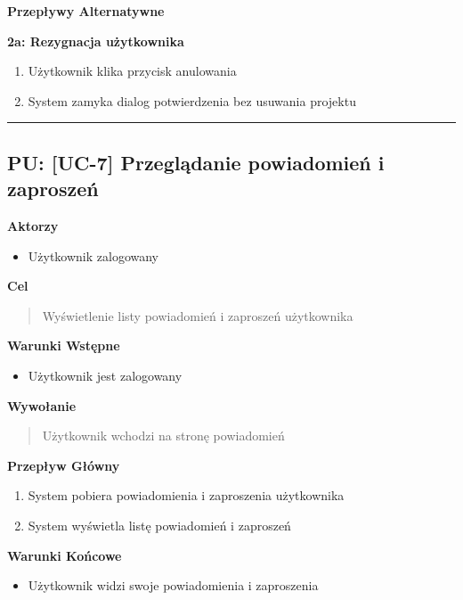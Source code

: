 \vspace{0.2cm}
\noindent\textbf{Przepływy Alternatywne}

\textbf{2a: Rezygnacja użytkownika}
\begin{enumerate}
    \item Użytkownik klika przycisk anulowania
    \item System zamyka dialog potwierdzenia bez usuwania projektu
\end{enumerate}


\hrule
\vspace{1cm}

\subsection*{PU: [UC-7] Przeglądanie powiadomień i zaproszeń}

\noindent\textbf{Aktorzy}
\begin{itemize}
    \item Użytkownik zalogowany
\end{itemize}

\vspace{0.2cm}
\noindent\textbf{Cel}
\begin{quote}
    Wyświetlenie listy powiadomień i zaproszeń użytkownika
\end{quote}

\vspace{0.2cm}
\noindent\textbf{Warunki Wstępne}
\begin{itemize}
    \item Użytkownik jest zalogowany
\end{itemize}

\vspace{0.2cm}
\noindent\textbf{Wywołanie}
\begin{quote}
    Użytkownik wchodzi na stronę powiadomień
\end{quote}

\vspace{0.2cm}
\noindent\textbf{Przepływ Główny}
\begin{enumerate}
    \item System pobiera powiadomienia i zaproszenia użytkownika
    \item System wyświetla listę powiadomień i zaproszeń
\end{enumerate}

\vspace{0.2cm}
\noindent\textbf{Warunki Końcowe}
\begin{itemize}
    \item Użytkownik widzi swoje powiadomienia i zaproszenia
\end{itemize}


